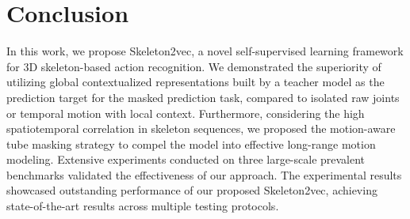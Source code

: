 \section{Conclusion}
In this work, we propose Skeleton2vec, a novel self-supervised learning framework
for 3D skeleton-based action recognition. We demonstrated the superiority of utilizing
global contextualized representations built by a teacher model as the prediction target
for the masked prediction task, compared to isolated raw joints or temporal motion with
local context. Furthermore, considering the high spatiotemporal correlation in skeleton
sequences, we proposed the motion-aware tube masking strategy to compel the model into
effective long-range motion modeling. Extensive experiments conducted on three large-scale
prevalent benchmarks validated the effectiveness of our approach. The experimental results
showcased outstanding performance of our proposed Skeleton2vec,
achieving state-of-the-art results across multiple testing protocols.